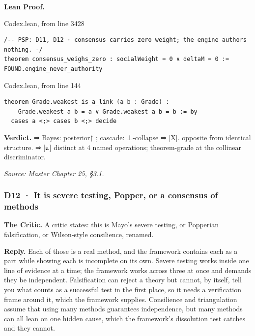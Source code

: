 \documentclass[10pt,twocolumn]{article}
\begin{document}
\textbf{Lean Proof.}

\begin{leanexcerpt}{Codex.lean, from line 3428}
\begin{lstlisting}[style=leanx,firstnumber=3428]
/-- PSP: D11, D12 · consensus carries zero weight; the engine authors nothing. -/
theorem consensus_weighs_zero : socialWeight = 0 ∧ deltaM = 0 := FOUND.engine_never_authority
\end{lstlisting}
\end{leanexcerpt}

\begin{leanexcerpt}{Codex.lean, from line 144}
\begin{lstlisting}[style=leanx,firstnumber=144]
theorem Grade.weakest_is_a_link (a b : Grade) :
    Grade.weakest a b = a ∨ Grade.weakest a b = b := by
  cases a <;> cases b <;> decide
\end{lstlisting}
\end{leanexcerpt}

\textbf{Verdict.} ⇒ Bayes: posterior↑ ; cascade: ⊥-collapse ⇒ {[}X{]}.
opposite from identical structure. ⇒ {[}⟀{]} distinct at 4 named
operations; theorem-grade at the collinear discriminator.

\emph{Source: Master Chapter 25, §3.1.}

\hypertarget{d12-it-is-severe-testing-popper-or-a-consensus-of-methods}{%
\subsubsection{D12 · It is severe testing, Popper, or a consensus of
methods}\label{d12-it-is-severe-testing-popper-or-a-consensus-of-methods}}

\textbf{The Critic.} A critic states: this is Mayo's severe testing, or
Popperian falsification, or Wilson-style consilience, renamed.

\textbf{Reply.} Each of those is a real method, and the framework
contains each as a part while showing each is incomplete on its own.
Severe testing works inside one line of evidence at a time; the
framework works across three at once and demands they be independent.
Falsification can reject a theory but cannot, by itself, tell you what
counts as a successful test in the first place, so it needs a
verification frame around it, which the framework supplies. Consilience
and triangulation assume that using many methods guarantees
independence, but many methods can all lean on one hidden cause, which
the framework's dissolution test catches and they cannot.
\end{document}
